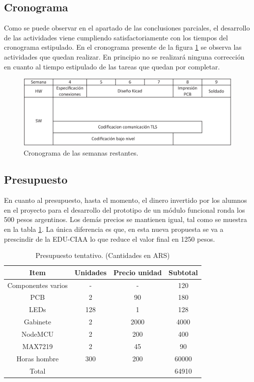\subsection{Cronograma}
Como se puede observar en el apartado de las conclusiones parciales, el desarrollo de las actividades viene cumpliendo satisfactoriamente con los tiempos del cronograma estipulado. En el cronograma presente de la figura \ref{fig:cronograma} se observa las actividades que quedan realizar. En principio no se realizará ninguna corrección en cuanto al tiempo estipulado de las tareas que quedan por completar.

\begin{figure}[h!]
    \centering
    \includegraphics[width=\linewidth]{imagenes/cronograma.pdf}
    \caption{Cronograma de las semanas restantes.}
    \label{fig:cronograma}
\end{figure}

\subsection{Presupuesto}
En cuanto al presupuesto, hasta el momento, el dinero invertido por los alumnos en el proyecto para el desarrollo del prototipo de un módulo funcional ronda los 500 pesos argentinos. Los demás precios se mantienen igual, tal como se muestra en la tabla \ref{tab:presupuesto}. La única diferencia es que, en esta nueva propuesta se va a prescindir de la EDU-CIAA lo que reduce el valor final en 1250 pesos.

\begin{table}[h!]
	\centering
	\caption{Presupuesto tentativo. (Cantidades en ARS)}
	\vspace{0.25cm}
	\label{tab:presupuesto}
	\begin{tabular}{cccc}
		Item				& Unidades		& Precio unidad		& Subtotal			\\
		\hline
		Componentes varios	& -				& -					& 120				\\
		PCB					& 2				& 90				& 180				\\
		LEDs				& 128			& 1					& 128				\\
		Gabinete			& 2				& 2000				& 4000				\\
		NodeMCU				& 2				& 200				& 400				\\
		MAX7219				& 2				& 45				& 90				\\
		Horas hombre		& 300			& 200				& 60000				\\
		\hline
		Total				&				&					& 64910				\\ 
		\hline
	\end{tabular}
\end{table}
